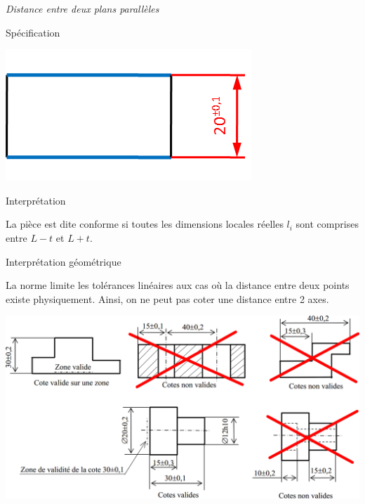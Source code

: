 \documentclass[11pt,oneside]{article}
\begin{document}
\begin{exemple}
\textit{Distance entre deux plans parallèles}

\begin{minipage}[t]{.3\linewidth}
\begin{center}
Spécification

\includegraphics[width=.95\textwidth]{png/lin_plan}
\end{center}
\end{minipage} \hfill
\begin{minipage}[t]{.3\linewidth}
\begin{center}
Interprétation
\end{center}

La pièce est dite conforme si toutes les dimensions locales réelles $l_i$ sont comprises entre $L-t$ et $L+t$.
\end{minipage} \hfill
\begin{minipage}[t]{.3\linewidth}
\begin{center}
Interprétation géométrique

\end{center}
\end{minipage}

\end{exemple}


\begin{warn}
La norme limite les tolérances linéaires aux cas où la distance entre deux points existe physiquement. Ainsi, on ne peut pas coter une distance entre 2 axes.
\end{warn}

\begin{exemple}
\begin{center}
\includegraphics[width=.95\textwidth]{png/ex_nonvalide}
\end{center}
\end{exemple}
\end{document}
